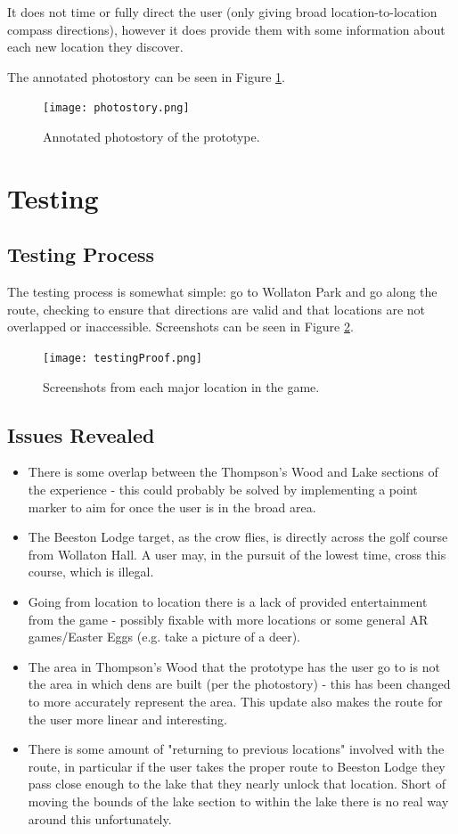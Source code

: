 \documentclass[12pt, a4paper]{article}
\begin{document}
It does not time or fully direct the user (only giving broad location-to-location compass directions), however it does provide them with some information about each new location they discover.

The annotated photostory can be seen in Figure \ref{fig:photostory}.

\begin{figure}[ht]
\centering
  \caption{Annotated photostory of the prototype.}
  \texttt{[image: photostory.png]}
  \label{fig:photostory}
\end{figure}

\section{Testing}
\subsection{Testing Process}
The testing process is somewhat simple: go to Wollaton Park and go along the route, checking to ensure that directions are valid and that locations are not overlapped or inaccessible.
Screenshots can be seen in Figure \ref{fig:testingProof}.

\begin{figure}[ht]
\centering
  \caption{Screenshots from each major location in the game.}
  \texttt{[image: testingProof.png]}
  \label{fig:testingProof}
\end{figure}

\subsection{Issues Revealed}
\begin{itemize}
  \item There is some overlap between the Thompson's Wood and Lake sections of the experience - this could probably be solved by implementing a point marker to aim for once the user is in the broad area.
  \item The Beeston Lodge target, as the crow flies, is directly across the golf course from Wollaton Hall.
A user may, in the pursuit of the lowest time, cross this course, which is illegal.
  \item Going from location to location there is a lack of provided entertainment from the game - possibly fixable with more locations or some general AR games/Easter Eggs (e.g. take a picture of a deer).
  \item The area in Thompson's Wood that the prototype has the user go to is not the area in which dens are built (per the photostory) - this has been changed to more accurately represent the area.
        This update also makes the route for the user more linear and interesting.
  \item There is some amount of "returning to previous locations" involved with the route, in particular if the user takes the proper route to Beeston Lodge they pass close enough to the lake that they nearly unlock that location.
        Short of moving the bounds of the lake section to within the lake there is no real way around this unfortunately.
\end{itemize}
\end{document}
